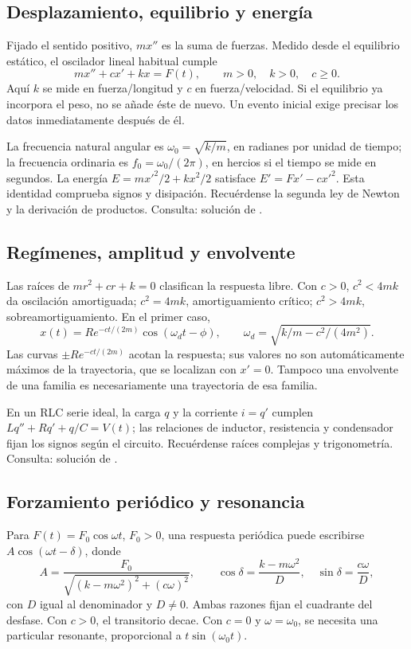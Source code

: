 %
\subsection*{Desplazamiento, equilibrio y energía}
\label{CH05-B01}
Fijado el sentido positivo, $m x''$ es la suma de fuerzas. Medido desde
el equilibrio estático, el oscilador lineal habitual cumple
\[
 m x''+c x'+kx=F(t),\qquad m>0,\quad k>0,\quad c\ge0.
\]
Aquí $k$ se mide en fuerza/longitud y $c$ en fuerza/velocidad. Si el
equilibrio ya incorpora el peso, no se añade éste de nuevo. Un evento
inicial exige precisar los datos inmediatamente después de él.

La frecuencia natural angular es $\omega_0=\sqrt{k/m}$, en radianes por
unidad de tiempo; la frecuencia ordinaria es $f_0=\omega_0/(2\pi)$, en
hercios si el tiempo se mide en segundos. La energía
$E=mx'^2/2+kx^2/2$ satisface $E'=F x'-c x'^2$.
Esta identidad comprueba signos y disipación. Recuérdense la segunda ley
de Newton y la derivación de productos. Consulta: solución de
.

%
\subsection*{Regímenes, amplitud y envolvente}
\label{CH05-B02}
Las raíces de $mr^2+cr+k=0$ clasifican la respuesta libre. Con $c>0$,
$c^2<4mk$ da oscilación amortiguada; $c^2=4mk$, amortiguamiento crítico;
$c^2>4mk$, sobreamortiguamiento. En el primer caso,
\[
 x(t)=R e^{-ct/(2m)}\cos(\omega_d t-\phi),\qquad
 \omega_d=\sqrt{k/m-c^2/(4m^2)}.
\]
Las curvas $\pm R e^{-ct/(2m)}$ acotan la respuesta; sus valores no son
automáticamente máximos de la trayectoria, que se localizan con $x'=0$.
Tampoco una envolvente de una familia es necesariamente una trayectoria
de esa familia.

En un RLC serie ideal, la carga $q$ y la corriente $i=q'$ cumplen
$Lq''+Rq'+q/C=V(t)$; las relaciones de inductor, resistencia y
condensador fijan los signos según el circuito. Recuérdense raíces
complejas y trigonometría. Consulta: solución de .

%
\subsection*{Forzamiento periódico y resonancia}
\label{CH05-B03}
Para $F(t)=F_0\cos\omega t$, $F_0>0$, una respuesta periódica puede
escribirse $A\cos(\omega t-\delta)$, donde
\[
 A=\frac{F_0}{\sqrt{(k-m\omega^2)^2+(c\omega)^2}},\qquad
 \cos\delta=\frac{k-m\omega^2}{D},\quad
 \sin\delta=\frac{c\omega}{D},
\]
con $D$ igual al denominador y $D\ne0$. Ambas razones fijan el cuadrante
del desfase. Con $c>0$, el transitorio decae. Con $c=0$ y
$\omega=\omega_0$, se necesita una particular resonante, proporcional
a $t\sin(\omega_0t)$.

